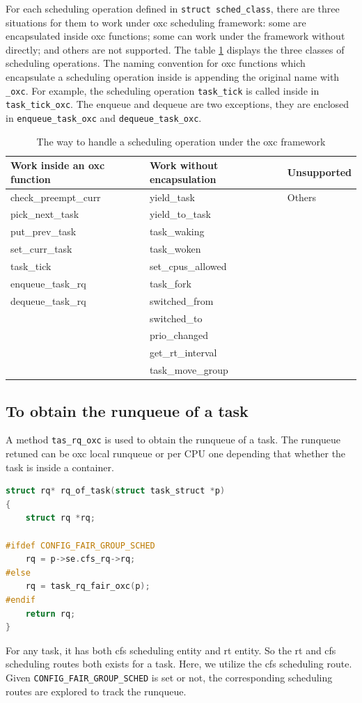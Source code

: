 For each scheduling operation defined in \texttt{struct sched\_class},
there are three situations for them to work under oxc scheduling framework: 
some are encapsulated inside oxc functions; some can work under the framework
without directly; and others are not supported. The table \ref{tab:op_classes}
displays the three classes of scheduling operations. The naming convention
for oxc functions which encapsulate a scheduling operation inside is appending
the original name with \texttt{\_oxc}. For example, the scheduling operation
\texttt{task\_tick} is called inside in \texttt{task\_tick\_oxc}.
The enqueue and dequeue are two exceptions, they are enclosed in 
\texttt{enqueue\_task\_oxc} and \texttt{dequeue\_task\_oxc}.
\begin{table}[thbp]
  \centering
  \begin{tabular}{l|l|l}\hline
	\small{Work inside an oxc function} & \small{Work without encapsulation} & \small{Unsupported}\\\hline
		check\_preempt\_curr	& yield\_task				& Others	\\
		pick\_next\_task	& yield\_to\_task			&		\\
		put\_prev\_task		& task\_waking				&		\\
		set\_curr\_task		& task\_woken				&		\\
		task\_tick		& set\_cpus\_allowed			&		\\
		enqueue\_task\_rq	& task\_fork				&		\\
		dequeue\_task\_rq	& switched\_from			&		\\
					& switched\_to				&		\\
					& prio\_changed				&		\\
					& get\_rt\_interval			&		\\
					& task\_move\_group			&		\\\hline
  \end{tabular}	
  \caption{The way to handle a scheduling operation under the oxc framework}
  \label{tab:op_classes}
\end{table}


\subsection{To obtain the runqueue of a task}
A method \texttt{tas\_rq\_oxc} is used to obtain the runqueue of a task.
The runqueue retuned can be oxc local runqueue or per CPU one depending
that whether the task is inside a container.
\begin{lstlisting}[language=C]
struct rq* rq_of_task(struct task_struct *p)
{
	struct rq *rq;

#ifdef CONFIG_FAIR_GROUP_SCHED
	rq = p->se.cfs_rq->rq;
#else
	rq = task_rq_fair_oxc(p);
#endif
	return rq;
}
\end{lstlisting}
For any task, it has both cfs scheduling entity and rt entity. So the
rt and cfs scheduling routes both exists for a task. Here, we utilize
the cfs scheduling route. Given \texttt{CONFIG\_FAIR\_GROUP\_SCHED}
is set or not, the corresponding scheduling routes are explored to
track the runqueue.

